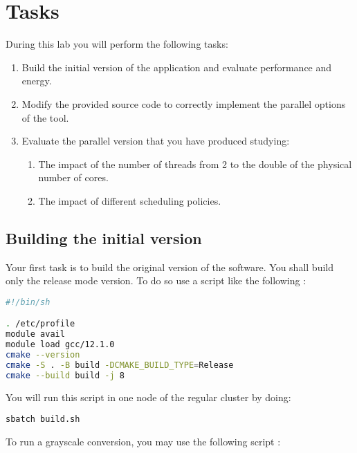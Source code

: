 \section{Tasks}

During this lab you will perform the following tasks:

\begin{enumerate}

\item Build the initial version of the application and evaluate performance and
energy.

\item Modify the provided source code to correctly implement the parallel
options of the tool.

\item Evaluate the parallel version that you have produced studying:

\begin{enumerate}
  \item The impact of the number of threads from 2 to the double of the physical
number of cores.
  \item The impact of different scheduling policies. 
\end{enumerate}

\end{enumerate}

\subsection{Building the initial version}

Your first task is to build the original version of the software. You shall
build only the release mode version. To do so use a script like the following
:

\begin{lstlisting}[language=bash]
#!/bin/sh

. /etc/profile
module avail
module load gcc/12.1.0
cmake --version
cmake -S . -B build -DCMAKE_BUILD_TYPE=Release
cmake --build build -j 8
\end{lstlisting}

You will run this script in one node of the regular cluster by doing:

\begin{lstlisting}[style=terminal]
sbatch build.sh
\end{lstlisting}

To run a grayscale conversion, you may use the following script
:

